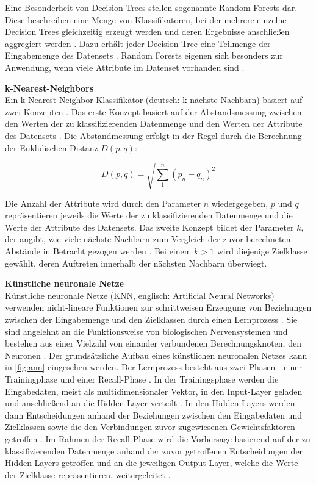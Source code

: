 Eine Besonderheit von Decision Trees stellen sogenannte Random Forests dar. Diese beschreiben eine Menge von Klassifikatoren, bei der mehrere einzelne Decision Trees gleichzeitig erzeugt werden und deren Ergebnisse anschließen aggregiert werden \cite{Alam2013}. Dazu erhält jeder Decision Tree eine Teilmenge der Eingabemenge des Datensets \cite{Alam2013}. Random Forests eigenen sich besonders zur Anwendung, wenn viele Attribute im Datenset vorhanden sind \cite{Alam2013}.

\textbf{k-Nearest-Neighbors\medskip}\\
Ein k-Nearest-Neighbor-Klassifikator (deutsch: k-nächste-Nachbarn) basiert auf zwei Konzepten \cite{Zhang2016}. Das erste Konzept basiert auf der Abstandsmessung zwischen den Werten der zu klassifizierenden Datenmenge und den Werten der Attribute des Datensets \cite{Zhang2016}. Die Abstandmessung erfolgt in der Regel durch die Berechnung der Euklidischen Distanz $D(p,q)$:

\[D(p,q)=\sqrt{\sum_1^n(p_{n}-q_{n})^{2}}\] 

Die Anzahl der Attribute wird durch den Parameter $n$ wiedergegeben, $p$ und $q$ repräsentieren jeweils die Werte der zu klassifizierenden Datenmenge und die Werte der Attribute des Datensets. Das zweite Konzept bildet der Parameter $k$, der angibt, wie viele nächste Nachbarn zum Vergleich der zuvor berechneten Abstände in Betracht gezogen werden \cite{Zhang2016}. Bei einem $k > 1$ wird diejenige Zielklasse gewählt, deren Auftreten innerhalb der nächsten Nachbarn überwiegt.

\textbf{Künstliche neuronale Netze\medskip}\\
Künstliche neuronale Netze (KNN, englisch: Artificial Neural Networks) verwenden nicht-lineare Funktionen zur schrittweisen Erzeugung von Beziehungen zwischen der Eingabemenge und den Zielklassen durch einen Lernprozess \cite{Linder2004}. Sie sind angelehnt an die Funktionsweise von biologischen Nervensystemen und bestehen aus einer Vielzahl von einander verbundenen Berechnungsknoten, den Neuronen \cite{OShea2015}. Der grundsätzliche Aufbau eines künstlichen neuronalen Netzes kann in \autoref{fig:ann} eingesehen werden. Der Lernprozess besteht aus zwei Phasen - einer Trainingphase und einer Recall-Phase \cite{Linder2004}. In der Trainingsphase werden die Eingabedaten, meist als multidimensionaler Vektor, in den Input-Layer geladen und anschließend an die Hidden-Layer verteilt \cite{OShea2015}. In den Hidden-Layers werden dann Entscheidungen anhand der Beziehungen zwischen den Eingabedaten und Zielklassen sowie die den Verbindungen zuvor zugewiesenen Gewichtsfaktoren getroffen \cite{Linder2004,OShea2015}. Im Rahmen der Recall-Phase wird die Vorhersage basierend auf der zu klassifizierenden Datenmenge anhand der zuvor getroffenen Entscheidungen der Hidden-Layers getroffen und an die jeweiligen Output-Layer, welche die Werte der Zielklasse repräsentieren, weitergeleitet \cite{Linder2004}. 

